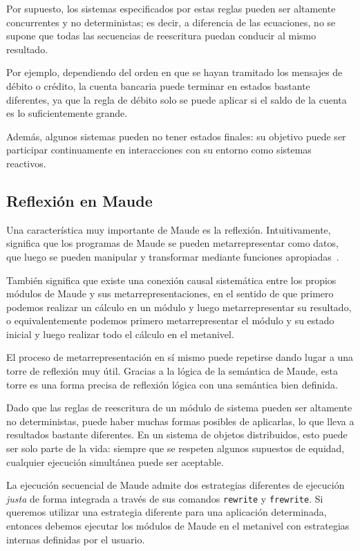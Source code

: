 Por supuesto, los sistemas especificados por estas reglas pueden ser altamente concurrentes y no deterministas; es decir, a diferencia de las ecuaciones, no se supone que todas las secuencias de reescritura puedan conducir al mismo resultado.
\smallskip

Por ejemplo, dependiendo del orden en que se hayan tramitado los mensajes de débito o crédito, la cuenta bancaria puede terminar en estados bastante diferentes, ya que la regla de débito solo se puede aplicar si el saldo de la cuenta es lo suficientemente grande.
\smallskip

Además, algunos sistemas pueden no tener estados finales: su objetivo puede ser participar continuamente en interacciones con su entorno como sistemas reactivos.



\subsection{Reflexión en Maude}

Una característica muy importante de Maude es la reflexión. Intuitivamente, significa que los programas de Maude se pueden metarrepresentar como datos, que luego se pueden manipular y transformar mediante funciones apropiadas~\citep{maude30}.
\smallskip

También significa que existe una conexión causal sistemática entre los propios módulos de Maude y sus metarrepresentaciones, en el sentido de que primero podemos realizar un cálculo en un módulo y luego metarrepresentar su resultado, o equivalentemente podemos primero metarrepresentar el módulo y su estado inicial y luego realizar todo el cálculo en el metanivel.
\smallskip

El proceso de metarrepresentación en sí mismo puede repetirse dando lugar a una torre de reflexión muy útil. Gracias a la lógica de la semántica de Maude, esta torre es una forma precisa de reflexión lógica con una semántica bien definida.
\bigskip


Dado que las reglas de reescritura de un módulo de sistema pueden ser altamente no deterministas, puede haber muchas formas posibles de aplicarlas, lo que lleva a resultados bastante diferentes. En un sistema de objetos distribuidos, esto puede ser solo parte de la vida: siempre que se respeten algunos supuestos de equidad, cualquier ejecución simultánea puede ser aceptable.
\smallskip

La ejecución secuencial de Maude admite dos estrategias diferentes de ejecución \textit{justa} de forma integrada a través de sus comandos \texttt{rewrite} y \texttt{frewrite}. 
Si queremos utilizar una estrategia diferente para una aplicación determinada, entonces debemos ejecutar los módulos de Maude en el metanivel con estrategias internas definidas por el usuario.

